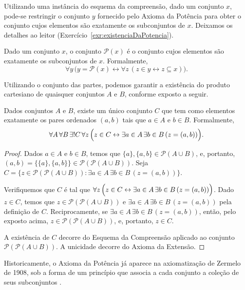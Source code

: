 Utilizando uma instância do esquema da compreensão, dado um conjunto $x$, pode-se restringir o conjunto $y$ fornecido pelo Axioma da Potência para obter o conjunto cujos elementos são exatamente os subconjuntos de $x$.
Deixamos os detalhes ao leitor (Exercício~\ref{exr:existenciaDaPotencia}).

\begin{definition}[$\ZmI$]\label{def:conjuntoDasPartes}
    Dado um conjunto $x$, o conjunto $\mathcal P(x)$ é o conjunto cujos elementos são exatamente os subconjuntos de $x$.
    Formalmente,
\[
    \forall y\,\bigl(y = \mathcal P(x) \leftrightarrow \forall z\,(z \in y \leftrightarrow z \subseteq x)\bigr).
\]
\end{definition}

Utilizando o conjunto das partes, podemos garantir a existência do produto cartesiano de quaisquer conjuntos $A$ e $B$, conforme exposto a seguir.
\begin{lemma}[$\ZmI$]\label{lem:existenciaDoProdutoCartesiano}
    Dados conjuntos $A$ e $B$, existe um único conjunto $C$ que tem como elementos exatamente os pares ordenados $(a, b)$ tais que $a \in A$ e $b \in B$.
    Formalmente,
    \[
        \forall A\, \forall B\, \exists! C\, \forall z\, \Bigl(z \in C \leftrightarrow \exists a \in A\, \exists b \in B\, (z = (a, b))\Bigr).
    \]
\end{lemma}
\begin{proof}
    Dados $a \in A$ e $b \in B$, temos que $\{a\}, \{a, b\} \in \mathcal P(A\cup B)$, e, portanto, $(a, b) = \{\{a\}, \{a, b\}\} \in \mathcal P(\mathcal P(A\cup B))$.
    Seja $C = \{z \in \mathcal P(\mathcal P(A\cup B)) : \exists a \in A\, \exists b \in B\, (z = (a, b))\}$.

    Verifiquemos que $C$ é tal que $\forall z\, \Bigl(z \in C \leftrightarrow \exists a \in A\, \exists b \in B\, (z = (a, b))\Bigr)$.
    Dado $z \in C$, temos que $z \in \mathcal P(\mathcal P(A\cup B))$ e $\exists a \in A\, \exists b \in B\, (z = (a, b))$ pela definição de $C$.
    Reciprocamente, se $\exists a \in A\, \exists b \in B\, (z = (a, b))$, então, pelo exposto acima, $z \in \mathcal P(\mathcal P(A\cup B))$, e, portanto, $z \in C$.

    A existência de $C$ decorre do Esquema da Compreensão aplicado ao conjunto $\mathcal P(\mathcal P(A\cup B))$.
    A unicidade decorre do Axioma da Extensão.
\end{proof}

Historicamente, o Axioma da Potência já aparece na axiomatização de Zermelo
de 1908, sob a forma de um princípio que associa a cada conjunto a coleção
de seus subconjuntos \cite{zermelo1908untersuchungen}.

